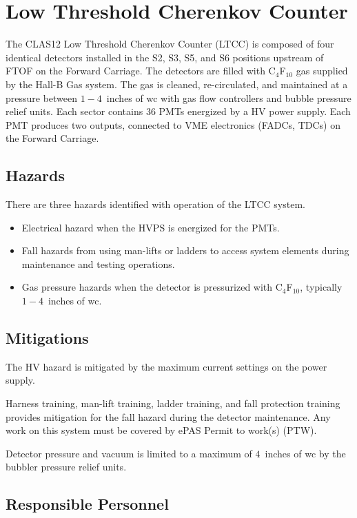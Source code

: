 \section{Low Threshold Cherenkov Counter}

The CLAS12 Low Threshold Cherenkov Counter (LTCC) is composed of four identical detectors
installed in the S2, S3, S5, and S6 positions upstream of FTOF on the Forward Carriage. 
The detectors are filled with C$_4$F$_{10}$ gas supplied by the Hall-B Gas system. The gas 
is cleaned, re-circulated, and maintained at a pressure between $1 - 4$~inches of wc with 
gas flow controllers and bubble pressure relief units. Each sector contains 36 PMTs energized 
by a HV power supply. Each PMT produces two outputs, connected to VME electronics (FADCs, 
TDCs) on the Forward Carriage.

\subsection{Hazards} 

There are three hazards identified with operation of the LTCC system. 
\begin{itemize}
\item Electrical hazard when the HVPS is energized for the PMTs.
\item Fall hazards from using man-lifts or ladders to access system elements during 
maintenance and testing operations. 
\item Gas pressure hazards when the detector is pressurized with C$_4$F$_{10}$, typically 
$1 -4$~inches of wc.
\end{itemize}

\subsection{Mitigations}

The HV hazard is mitigated by the maximum current settings on the power supply.

Harness training, man-lift training, ladder training, and fall protection training provides 
mitigation for the fall hazard during the detector maintenance.  Any work on this system must
be covered by ePAS Permit to work(s) (PTW).

Detector pressure and vacuum is limited to a maximum of $4$~inches of wc by the bubbler 
pressure relief units.

\subsection{Responsible Personnel}


